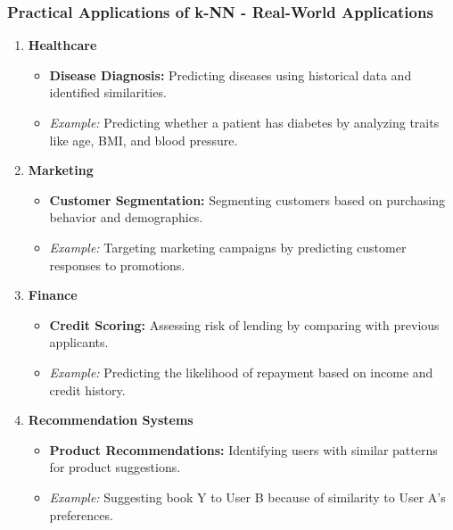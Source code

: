 \documentclass[aspectratio=169]{beamer}
\begin{document}
\begin{frame}[fragile]
    \frametitle{Practical Applications of k-NN - Real-World Applications}
    \begin{enumerate}
        \item \textbf{Healthcare}
        \begin{itemize}
            \item \textbf{Disease Diagnosis:} Predicting diseases using historical data and identified similarities.
            \item \textit{Example:} Predicting whether a patient has diabetes by analyzing traits like age, BMI, and blood pressure.
        \end{itemize}
        
        \item \textbf{Marketing}
        \begin{itemize}
            \item \textbf{Customer Segmentation:} Segmenting customers based on purchasing behavior and demographics.
            \item \textit{Example:} Targeting marketing campaigns by predicting customer responses to promotions.
        \end{itemize}
        
        \item \textbf{Finance}
        \begin{itemize}
            \item \textbf{Credit Scoring:} Assessing risk of lending by comparing with previous applicants.
            \item \textit{Example:} Predicting the likelihood of repayment based on income and credit history.
        \end{itemize}
        
        \item \textbf{Recommendation Systems}
        \begin{itemize}
            \item \textbf{Product Recommendations:} Identifying users with similar patterns for product suggestions.
            \item \textit{Example:} Suggesting book Y to User B because of similarity to User A's preferences.
        \end{itemize}
    \end{enumerate}
\end{frame}
\end{document}
